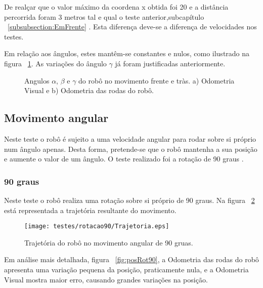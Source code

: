 De realçar que o valor máximo da coordena x obtida foi 20 e a distância percorrida foram 3 metros tal e qual o teste anterior,subcapítulo ~\ref{subsubsection:EmFrente} . Esta diferença deve-se a diferença de velocidades nos testes.


Em relação aos ângulos, estes mantêm-se constantes e nulos, como ilustrado na figura ~\ref{fig:ang3mFrente2mTraz}. As variações do ângulo $\gamma$ já foram justificadas anteriormente.


\begin{figure}[h!]
	\centering
	\qquad
	\caption{Angulos $\alpha$, $\beta$ e $\gamma$ do robô  no movimento frente e tràs. a) Odometria Visual e b) Odometria das rodas do robô.}
	\label{fig:ang3mFrente2mTraz}
\end{figure}


\FloatBarrier
\subsection{Movimento angular}\label{subsubsection:Rotacao}

Neste teste o robô é sujeito a uma velocidade angular para rodar sobre si próprio num ângulo apenas. Desta forma, pretende-se que o robô mantenha a sua posição e aumente o valor de um ângulo. O teste realizado foi a rotação de 90 graus .


\FloatBarrier
\subsubsection{90 graus}\label{subsubsection:Rotacao90}


Neste teste o robô realiza uma rotação sobre si próprio de 90 graus. Na figura ~\ref{fig:trajRoboRot90} está representada a trajetória resultante do movimento. 

\begin{figure}[h!]
	\begin{center}
		\leavevmode		
		\texttt{[image: testes/rotacao90/Trajetoria.eps]}
		\caption{Trajetória do robô no movimento angular de 90 gruas.}
		\label{fig:trajRoboRot90}
	\end{center}
\end{figure}


Em análise mais detalhada, figura ~\ref{fig:posRot90}, a Odometria das rodas do robô  apresenta uma variação pequena da posição, praticamente nula, e a Odometria Visual mostra maior erro, causando grandes variações na posição. 

